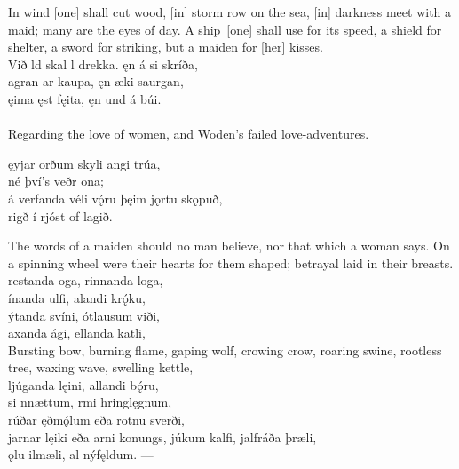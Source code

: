 \bvb In wind [one] shall cut wood, [in] storm row on the sea, [in] darkness meet with a maid; many are the eyes of day. A ship [one] shall use for its speed, a shield for shelter, a sword for striking, but a maiden for [her] kisses. \\

\bva Við ld skal l drekka. \hld ęn á si skríða, \\%
agran ar kaupa, \hld ęn æki saurgan, \\%
ęima ęst fęita, \hld ęn und á búi. \\%

 \\

	Regarding the love of women, and Woden's failed love-adventures.

\bva {}ęyjar orðum \hld skyli angi trúa, \\%
\ind né því's veðr ona; \\%
á verfanda véli \hld vǫ́ru þęim jǫrtu skǫpuð, \\%
\ind {}rigð í rjóst of lagið\footnotemark[29]. \\%

\bvb The words of a maiden should no man believe, nor that which a woman says. On a spinning wheel were their hearts for them shaped; betrayal laid in their breasts. \\

\bva {}restanda oga, \hld {}rinnanda loga, \\%
ínanda ulfi, \hld {}alandi krǫ́ku, \\%
ýtanda svíni, \hld {}ótlausum viði, \\%
axanda ági, \hld {}ellanda katli,\\%

\bvb Bursting bow, burning flame, gaping wolf, crowing crow, roaring swine, rootless tree, waxing wave, swelling kettle, \\

\bva {}ljúganda lęini, \hld {}allandi bǫ́ru, \\%
si nnættum, \hld {}rmi hringlęgnum, \\%
rúðar ęðmǫ́lum \hld eða rotnu sverði, \\%
jarnar lęiki \hld eða arni konungs,
júkum kalfi, \hld {}jalfráða þræli, \\%
ǫlu ilmæli, \hld {}al nýfęldum. —\\%

